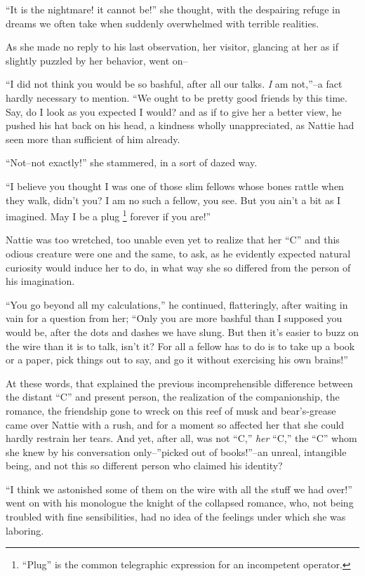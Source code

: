 ``It is the nightmare! it cannot be!'' she thought, with the despairing
refuge in dreams we often take when suddenly overwhelmed with terrible
realities.

As she made no reply to his last observation, her visitor, glancing at
her as if slightly puzzled by her behavior, went on--

``I did not think you would be so bashful, after all our talks. \emph{I} am
not,''--a fact hardly necessary to mention. ``We ought to be pretty good
friends by this time. Say, do I look as you expected I would? and as if
to give her a better view, he pushed his hat back on his head, a
kindness wholly unappreciated, as Nattie had seen more than sufficient
of him already.

``Not--not exactly!'' she stammered, in a sort of dazed way.

``I believe you thought I was one of those slim fellows whose bones
rattle when they walk, didn't you? I am no such a fellow, you see. But
you ain't a bit as I imagined. May I be a plug \footnote{``Plug'' is the common telegraphic expression for an incompetent
operator.} forever if you are!''

Nattie was too wretched, too unable even yet to realize that her ``C'' and
this odious creature were one and the same, to ask, as he evidently
expected natural curiosity would induce her to do, in what way she so
differed from the person of his imagination.

``You go beyond all my calculations,'' he continued, flatteringly, after
waiting in vain for a question from her; ``Only you are more bashful than
I supposed you would be, after the dots and dashes we have slung. But
then it's easier to buzz on the wire than it is to talk, isn't it? For
all a fellow has to do is to take up a book or a paper, pick things out
to say, and go it without exercising his own brains!''

At these words, that explained the previous incomprehensible difference
between the distant ``C'' and present person, the realization of the
companionship, the romance, the friendship gone to wreck on this reef of
musk and bear's-grease came over Nattie with a rush, and for a moment
so affected her that she could hardly restrain her tears. And yet, after
all, was not ``C,'' \emph{her} ``C,'' the ``C'' whom she knew by his conversation
only--''picked out of books!''--an unreal, intangible being, and not this
so different person who claimed his identity?

``I think we astonished some of them on the wire with all the stuff we
had over!'' went on with his monologue the knight of the collapsed
romance, who, not being troubled with fine sensibilities, had no idea of
the feelings under which she was laboring.

